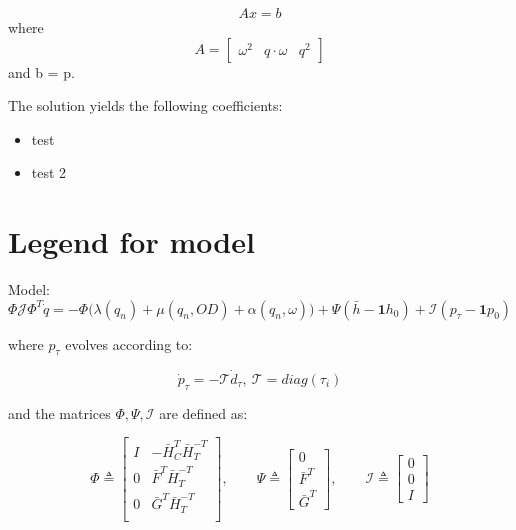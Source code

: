 \begin{equation}
	Ax = b
\end{equation}
where 
\begin{equation}
	A = \begin{bmatrix}
			\omega^2 & q \cdot \omega & q^2
			\end{bmatrix}
\end{equation}
and b = p.

The solution yields the following coefficients:
\begin{itemize}
	\item test
	\item test 2
\end{itemize}









\section{Legend for model}

Model:
\begin{equation}\label{eq:NonLinearModelWithTank}
	\Phi\mathcal{J}\Phi^T \dot{q} = -\Phi\Big(\lambda(q_n)+\mu(q_n,OD)+\alpha(q_n,\omega)\Big) + \Psi(\bar{h}-\mathbf{1}h_0) + \mathcal{I}(p_{\tau}-\mathbf{1}p_0)
\end{equation}

where $p_{\tau}$ evolves according to:

\begin{equation}\label{eq:TankDynamics}
	\dot{p}_{\tau} = - \mathcal{T} \dot{d}_{\tau}, \ \mathcal{T} = diag(\tau_i)
\end{equation}

and the matrices $\Phi, \Psi, \mathcal{I}$ are defined as:

\begin{equation}\label{eq:NonLinearModelMatrices}
	\Phi \triangleq 
	\begin{bmatrix} 
		I & -\bar{H}_C^T\bar{H}_T^{-T} \\ 0 & \bar{F}^T\bar{H}_T^{-T} \\ 0  & \bar{G}^T\bar{H}_T^{-T} \\ 
	\end{bmatrix}
	, \qquad
	\Psi \triangleq
	\begin{bmatrix}
		0 \\ \bar{F}^T \\ \bar{G}^T
	\end{bmatrix}
	, \qquad
	\mathcal{I} \triangleq
	\begin{bmatrix}
		0 \\ 0 \\ I
	\end{bmatrix}
\end{equation}

